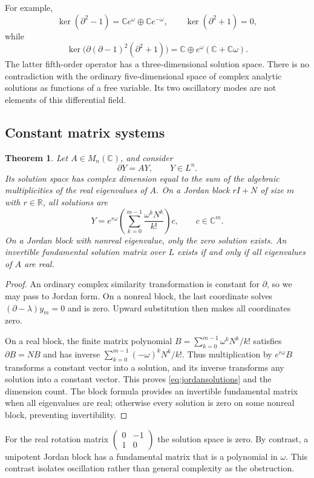 \documentclass[11pt]{article}
\numberwithin{equation}{section}
\newtheorem{theorem}{Theorem}[section]
\theoremstyle{definition}
\newcommand{\R}{\mathbb R}
\newcommand{\C}{\mathbb C}
\newcommand{\DD}{\partial}
\begin{document}
For example,
\[
 \ker(\DD^2-1)=\C e^\omega\oplus\C e^{-\omega},\qquad
 \ker(\DD^2+1)=0,
\]
while
\[
 \ker\!\bigl(\DD(\DD-1)^2(\DD^2+1)\bigr)
     =\C\oplus e^\omega(\C+\C\omega).
\]
The latter fifth-order operator has a three-dimensional solution space.
There is no contradiction with the ordinary five-dimensional space of
complex analytic solutions as functions of a free variable. Its two
oscillatory modes are not elements of this differential field.

\subsection{Constant matrix systems}
\begin{theorem}\label{thm:matrixsystems}
Let $A\in M_n(\C)$, and consider
\begin{equation}\label{eq:matrixsystem}
 \DD Y=AY,\qquad Y\in L^n.
\end{equation}
Its solution space has complex dimension equal to the sum of the
algebraic multiplicities of the real eigenvalues of $A$. On a Jordan block
$rI+N$ of size $m$ with $r\in\R$, all solutions are
\begin{equation}\label{eq:jordansolutions}
 Y=e^{r\omega}
       \left(\sum_{k=0}^{m-1}\frac{\omega^kN^k}{k!}\right)c,
 \qquad c\in\C^m.
\end{equation}
On a Jordan block with nonreal eigenvalue, only the zero solution exists.
An invertible fundamental solution matrix over $L$ exists if and only if
all eigenvalues of $A$ are real.
\end{theorem}
\begin{proof}
An ordinary complex similarity transformation is constant for $\DD$, so
we may pass to Jordan form. On a nonreal block, the last coordinate solves
$(\DD-\lambda)y_m=0$ and is zero. Upward substitution then makes
all coordinates zero.

On a real block, the finite matrix polynomial
$B=\sum_{k=0}^{m-1}\omega^kN^k/k!$ satisfies $\DD B=NB$ and
has inverse $\sum_{k=0}^{m-1}(-\omega)^kN^k/k!$. Thus multiplication
by $e^{r\omega}B$ transforms a constant vector into a solution, and its
inverse transforms any solution into a constant vector. This proves
\eqref{eq:jordansolutions} and the dimension count. The block formula
provides an invertible fundamental matrix when all eigenvalues are real;
otherwise every solution is zero on some nonreal block, preventing
invertibility.
\end{proof}

For the real rotation matrix
$\left(\begin{smallmatrix}0&-1\\1&0\end{smallmatrix}\right)$ the
solution space is zero. By contrast, a unipotent Jordan block has a
fundamental matrix that is a polynomial in $\omega$. This contrast
isolates oscillation rather than general complexity as the obstruction.
\end{document}
